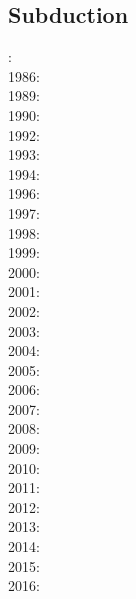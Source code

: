 \subsection*{Subduction}

: \cite{thar85}\\
1986: \cite{jarr86}\\
1989: \cite{boww89}\\
1990: \cite{hstt90}\\
1992: \cite{zhgu92}\cite{whbw92}\\
1993: \cite{jope93}\cite{dvnm93}\\
1994: \cite{zhgu94}\cite{wibe94}\cite{wdbo94a}\cite{wdbo94b}\\
1996: \cite{chri96}\\
1997: \cite{hajc97}\cite{kisa97}\\
1998: \cite{itki98}\cite{buwg98}\cite{brmy98}\\
1999: \cite{hagu99}\cite{befo99}\\
2000: \cite{tesc00}\cite{brky00}\cite{bemh00}\\
2001: \cite{bujl01}\cite{bugw01}\cite{chys01}\\
2002: \cite{civv02}\cite{clbb02}\\
2003: \cite{refm03}\\
2004: \cite{toba04}\cite{bocj04}\cite{bejn04}\\
2005: \cite{jalo05}\cite{lahb05}\\
2006: \cite{degw06}\cite{rohu06}\cite{masr06}\\
2007: \cite{artd07}\cite{yaab07}\cite{cubh07}\cite{civv07}\cite{masp07}\\
2008: \cite{yaba08}\cite{ozrs08}\cite{dihf08}\cite{wabj08}\cite{wabj08b}\cite{boht08b}
\cite{boht08a}\cite{baso08}\\
2009: \cite{yahb09}\cite{bill09}\cite{fagb09}\cite{bejb09}\cite{kecw09}\\
2010: \cite{hagr10}\cite{lobh10}\cite{mamb10}\\
2011: \cite{lixg11}\cite{list11}\cite{bubj11}\cite{bagw11b}\cite{cafz11}\\
2012: \cite{anwb12}\cite{jahu12}\cite{jabi12}\cite{jabk12}\cite{lixg12}\cite{lixg13}
\cite{ronb12}\cite{tebu12}\cite{thka12}\cite{bova12}\cite{civs12}\cite{camo12}\cite{cafa12}\\
2013: \cite{nabg13}\cite{hage13}\cite{ancv13}\cite{namu13}\cite{yosh13}\cite{zhgt13}
\cite{jabr13}\cite{izht13}\cite{luws13}\cite{dusc13}\cite{tibb13}\cite{bubj13}\cite{scmo13}
\cite{magc13}\cite{musi13}\cite{mibg13}\\
2014: \cite{robn14}\cite{hond14}\cite{ronc14}\cite{mobm14}\\
2015: \cite{bemm15}\cite{bomv15}\cite{bogf15}\cite{ceag15}\cite{kifr15}\\
2016: \cite{tomy16}

